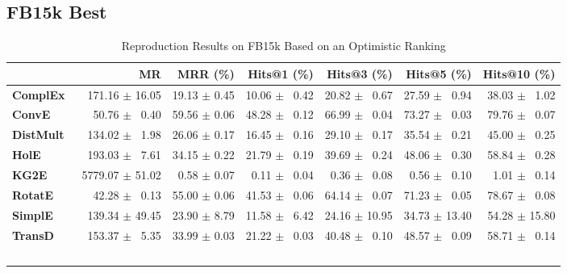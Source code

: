 \documentclass[journal]{IEEEtran}
\begin{document}
\subsection{FB15k Best}
\begin{table*}
    \caption{Reproduction Results on FB15k Based on an Optimistic Ranking}
    \label{tab:fb15k_full_results_optimistic_ranking}
    \centering
    \begin{tabular}{lrrrrrr}
\toprule
{} &                MR &      MRR (\%) &    Hits@1 (\%) &    Hits@3 (\%) &    Hits@5 (\%) &   Hits@10 (\%) \\
\midrule
\textbf{ComplEx } &  $\phantom{5}$$\phantom{5}$171.16 $\pm$ 16.05 &  19.13 $\pm$ 0.45 &  10.06 $\pm$ $\phantom{5}$0.42 &  20.82 $\pm$ $\phantom{5}$0.67 &  27.59 $\pm$ $\phantom{5}$0.94 &  38.03 $\pm$ $\phantom{5}$1.02 \\
\textbf{ConvE   } &  $\phantom{5}$$\phantom{5}$$\phantom{5}$50.76 $\pm$ $\phantom{5}$0.40 &  59.56 $\pm$ 0.06 &  48.28 $\pm$ $\phantom{5}$0.12 &  66.99 $\pm$ $\phantom{5}$0.04 &  73.27 $\pm$ $\phantom{5}$0.03 &  79.76 $\pm$ $\phantom{5}$0.07 \\
\textbf{DistMult} &  $\phantom{5}$$\phantom{5}$134.02 $\pm$ $\phantom{5}$1.98 &  26.06 $\pm$ 0.17 &  16.45 $\pm$ $\phantom{5}$0.16 &  29.10 $\pm$ $\phantom{5}$0.17 &  35.54 $\pm$ $\phantom{5}$0.21 &  45.00 $\pm$ $\phantom{5}$0.25 \\
\textbf{HolE    } &  $\phantom{5}$$\phantom{5}$193.03 $\pm$ $\phantom{5}$7.61 &  34.15 $\pm$ 0.22 &  21.79 $\pm$ $\phantom{5}$0.19 &  39.69 $\pm$ $\phantom{5}$0.24 &  48.06 $\pm$ $\phantom{5}$0.30 &  58.84 $\pm$ $\phantom{5}$0.28 \\
\textbf{KG2E    } &  $\phantom{5}$5779.07 $\pm$ 51.02 &  $\phantom{5}$0.58 $\pm$ 0.07 &  $\phantom{5}$0.11 $\pm$ $\phantom{5}$0.04 &  $\phantom{5}$0.36 $\pm$ $\phantom{5}$0.08 &  $\phantom{5}$0.56 $\pm$ $\phantom{5}$0.10 &  $\phantom{5}$1.01 $\pm$ $\phantom{5}$0.14 \\
\textbf{RotatE  } &  $\phantom{5}$$\phantom{5}$$\phantom{5}$42.28 $\pm$ $\phantom{5}$0.13 &  55.00 $\pm$ 0.06 &  41.53 $\pm$ $\phantom{5}$0.06 &  64.14 $\pm$ $\phantom{5}$0.07 &  71.23 $\pm$ $\phantom{5}$0.05 &  78.67 $\pm$ $\phantom{5}$0.08 \\
\textbf{SimplE  } &  $\phantom{5}$$\phantom{5}$139.34 $\pm$ 49.45 &  23.90 $\pm$ 8.79 &  11.58 $\pm$ $\phantom{5}$6.42 &  24.16 $\pm$ 10.95 &  34.73 $\pm$ 13.40 &  54.28 $\pm$ 15.80 \\
\textbf{TransD  } &  $\phantom{5}$$\phantom{5}$153.37 $\pm$ $\phantom{5}$5.35 &  33.99 $\pm$ 0.03 &  21.22 $\pm$ $\phantom{5}$0.03 &  40.48 $\pm$ $\phantom{5}$0.10 &  48.57 $\pm$ $\phantom{5}$0.09 &  58.71 $\pm$ $\phantom{5}$0.14 \\
$$
\end{tabular}
\end{table*}
\end{document}
